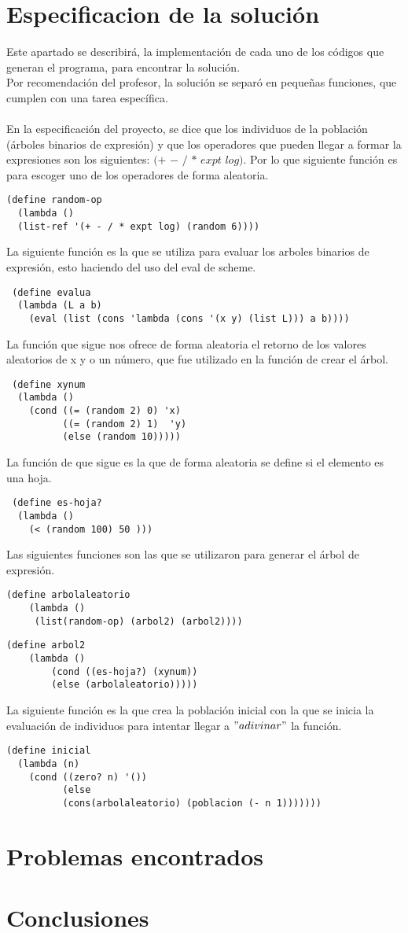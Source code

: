 \documentclass[10pt,a4paper]{article}
\begin{document}
\section{Especificacion de la solución}
 Este apartado se describirá, la implementación de cada uno de los códigos que generan el programa, para encontrar la solución.\\
Por recomendación del profesor, la solución se separó en pequeñas funciones, que cumplen con una tarea específica.\\\\
En la especificación del proyecto, se dice que los individuos de la población (árboles binarios de expresión) y que los operadores que pueden llegar a formar la expresiones son los siguientes: $(+$ $-$ $/$ $*$ $expt$ $log)$. Por lo que siguiente función es para escoger uno de los operadores de forma aleatoria.  
\begin{verbatim}
(define random-op
  (lambda ()
  (list-ref '(+ - / * expt log) (random 6))))
\end{verbatim}
 La siguiente función es la que se utiliza para evaluar los arboles binarios de expresión, esto haciendo del uso del eval de scheme. 
 \begin{verbatim}
 (define evalua
  (lambda (L a b)
    (eval (list (cons 'lambda (cons '(x y) (list L))) a b))))
 \end{verbatim}
 La función que sigue nos ofrece de forma aleatoria el retorno de los valores aleatorios de x y o un número, que fue utilizado en la función de crear el árbol.
 \begin{verbatim}
 (define xynum
  (lambda ()
    (cond ((= (random 2) 0) 'x)
          ((= (random 2) 1)  'y)
          (else (random 10)))))
\end{verbatim}
 La función de que sigue es la que de forma aleatoria se define si el elemento es una hoja. 
 \begin{verbatim}
 (define es-hoja?
  (lambda ()
    (< (random 100) 50 )))
 \end{verbatim}
 Las siguientes funciones son las que se utilizaron para generar el árbol de expresión.
 \begin{verbatim}
(define arbolaleatorio
	(lambda ()
	 (list(random-op) (arbol2) (arbol2))))
\end{verbatim}
\begin{verbatim}
(define arbol2
	(lambda ()
		(cond ((es-hoja?) (xynum))
		(else (arbolaleatorio)))))
\end{verbatim}  
La siguiente función es la que crea la población inicial con la que se inicia la evaluación de individuos para intentar llegar a $"adivinar"$ la función.
\begin{verbatim}
(define inicial
  (lambda (n)
    (cond ((zero? n) '())
          (else
          (cons(arbolaleatorio) (poblacion (- n 1)))))))
\end{verbatim}
\pagebreak
\section{Problemas encontrados}
\section{Conclusiones}
\end{document}
